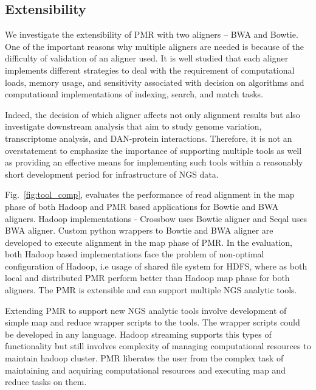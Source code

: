 \documentclass{acm_proc_article-sp}
\begin{document}
\subsection{Extensibility}

We investigate the extensibility of PMR with two aligners -- BWA and
Bowtie.  One of the important reasons why multiple aligners are needed
is because of the difficulty of validation of an aligner used.  It is
well studied that each aligner implements different strategies to deal
with the requirement of computational loads, memory usage, and
sensitivity associated with decision on algorithms and computational
implementations of indexing, search, and match
tasks\cite{mapping-survey}.

Indeed, the decision of which aligner affects not only alignment
results but also investigate downstream analysis that aim to study
genome variation, transcriptome analysis, and DAN-protein
interactions. Therefore, it is not an overstatement to emphasize the
importance of supporting multiple tools as well as providing an
effective means for implementing such tools within a reasonably short
development period for infrastructure of NGS data.

Fig.~\ref{fig:tool_comp}, evaluates the performance of read alignment
in the map phase of both Hadoop and PMR based applications for Bowtie
and BWA aligners. Hadoop implementations - Crossbow uses Bowtie
aligner and Seqal uses BWA aligner.  Custom python wrappers to Bowtie
and BWA aligner are developed to execute alignment in the map phase of
PMR. In the evaluation, both Hadoop based implementations face the
problem of non-optimal configuration of Hadoop, i.e usage of shared
file system for HDFS, where as both local and distributed PMR perform
better than Hadoop map phase for both aligners. The PMR is extensible
and can support multiple NGS analytic tools.

Extending PMR to support new NGS analytic tools involve development of
simple map and reduce wrapper scripts to the tools. The wrapper
scripts could be developed in any language.  Hadoop streaming supports
this types of functionality but still involves complexity of managing
computational resources to maintain hadoop cluster.  PMR liberates the
user from the complex task of maintaining and acquiring computational
resources and executing map and reduce tasks on them.
\end{document}
